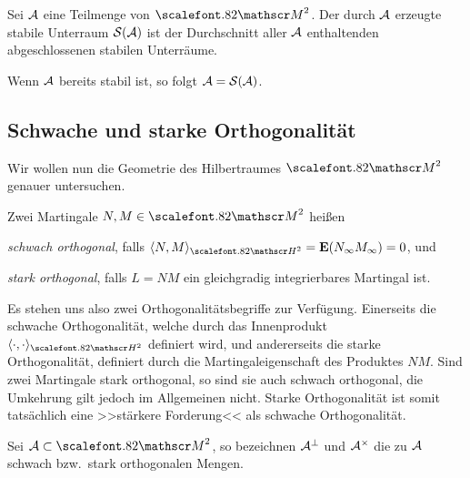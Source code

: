 \begin{definition}
\label{defn:5.3}
  Sei $\AA$ eine Teilmenge von $\MM^2$. Der durch $\AA$ erzeugte stabile
  Unterraum \emph{$\SS(\AA)$} ist der Durchschnitt aller $\AA$ enthaltenden
  abgeschlossenen stabilen Unterräume.\fish
\end{definition}

\begin{rem*}
Wenn $\AA$ bereits stabil ist, so folgt $\AA = \SS(\AA)$.\map
\end{rem*}

\subsection{Schwache und starke Orthogonalität}

Wir wollen nun die Geometrie des Hilbertraumes $\MM^2$ genauer untersuchen.

\begin{definition}
\label{defn:5.4}
Zwei Martingale $N,M \in \MM^2$ heißen
\begin{defnenum}
\item \emph{schwach orthogonal}, falls $\lin{N,M}_{\HH^2} = \E(N_\infty
M_\infty)=0$, und
\item \emph{stark orthogonal}, falls $L=NM$ ein gleichgradig
integrierbares Martingal ist.~\fish  
\end{defnenum}
\end{definition}

Es stehen uns also zwei Orthogonalitätsbegriffe zur Verfügung. Einerseits die
schwache Orthogonalität, welche durch das Innenprodukt
$\lin{\cdot,\cdot}_{\HH^2}$ definiert wird, und andererseits die starke
Orthogonalität, definiert durch die Martingaleigenschaft des Produktes $NM$.
Sind zwei Martingale stark orthogonal, so sind sie auch schwach orthogonal, die
Umkehrung gilt jedoch im Allgemeinen nicht. Starke Orthogonalität ist somit
tatsächlich eine >>stärkere Forderung<< als schwache Orthogonalität.

\begin{definition}
\label{defn:5.5}
Sei $\AA \subset \MM^2$, so bezeichnen $\AA^\perp$ und $\AA^\times$
die zu $\AA$ schwach bzw.\ stark orthogonalen Mengen.\fish
\end{definition}

